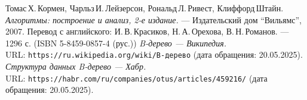 \begin{thebibliography}{99}
Томас\,Х.\,Кормен, Чарльз\,И.\,Лейзерсон, Рональд\,Л.\,Ривест, Клиффорд\,Штайн.
{\itshape Алгоритмы: построение и анализ, 2-е издание.} --- Издательский дом \enquote{Вильямс}, 2007. Перевод с английского: И.\,В.\,Красиков, Н.\,А.\,Орехова, В.\,Н.\,Романов. --- 1296 с. (ISBN 5-8459-0857-4 (рус.))
{\itshape B-дерево — Википедия.} \\URL: \texttt{https://ru.wikipedia.org/wiki/B-дерево} (дата обращения: 20.05.2025).
{\itshape Структура данных B-дерево — Хабр.} \\URL: \texttt{https://habr.com/ru/companies/otus/articles/459216/} (дата обращения: 20.05.2025).
\end{thebibliography}
\pagebreak



